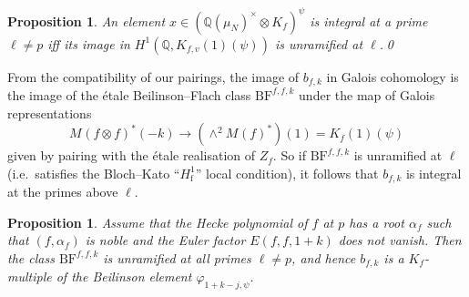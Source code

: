\documentclass[11pt, a4paper, reqno]{amsart}
\theoremstyle{definition}
\theoremstyle{plain}
\newtheorem{proposition}[definition]{Proposition}
\theoremstyle{remark}
\DeclareMathOperator{\et}{\acute{e}t}
\newcommand{\numberset}{\mathbb}
\newcommand{\Q}{\numberset{Q}}
\newcommand{\BF}{\mathrm{BF}}
\begin{document}
  \begin{proposition}\label{prop:p-adic-unram}
   An element $x \in (\Q(\mu_N)^{\times} \otimes K_f)^{\psi}$ is integral at a prime $\ell \ne p$ iff its image in $H^1(\Q, K_{f, v}(1)(\psi))$ is unramified at $\ell$.\qed
  \end{proposition}

  From the compatibility of our pairings, the image of $b_{f, k}$ in Galois cohomology is the image of the \'etale Beilinson--Flach class $\BF^{f, f, k}_{\et}$ under the map of Galois representations
  \[ M_{\et}(f \otimes f)^*(-k) \to (\wedge^2 M_{\et}(f)^*)(1) = K_f(1)(\psi) \]
  given by pairing with the \'etale realisation of $Z_f$. So if $\BF^{f, f, k}_{\et}$ is unramified at $\ell$ (i.e.~satisfies the Bloch--Kato ``$H^1_{\mathrm{f}}$'' local condition), it follows that $b_{f, k}$ is integral at the primes above $\ell$.

  \begin{proposition}
   Assume that the Hecke polynomial of $f$ at $p$ has a root $\alpha_f$ such that $(f, \alpha_f)$ is noble and the Euler factor $E(f, f, 1 + k)$ does not vanish. Then the class $\BF^{f, f, k}_{\et}$ is unramified at all primes $\ell \ne p$, and hence $b_{f, k}$ is a $K_f$-multiple of the Beilinson element $\varphi_{1+k-j, \psi}$.
  \end{proposition}
\end{document}
